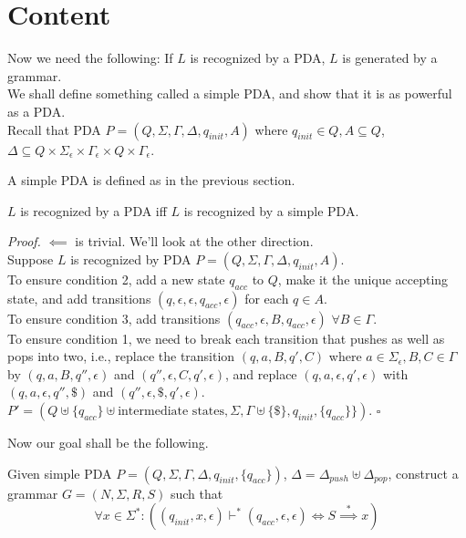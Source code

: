 \documentclass[a4paper]{article}
\newenvironment{proof}{\begin{breakbox}\textit{Proof.}}{\hfill$\square$\end{breakbox}}
\newcommand{\nl}{\vspace{0.2cm}\\}
\newcommand{\derives}{\stackrel{*}{\implies}}
\newcommand{\changesto}{\vdash}
\begin{document}
\section{Content}

Now we need the following: If $L$ is recognized by a PDA, $L$ is generated by a grammar.\nl
We shall define something called a simple PDA, and show that it is as powerful as a PDA.\nl

Recall that PDA $P = (Q, \Sigma, \Gamma, \Delta, q_{init}, A)$ where $q_{init} \in Q, A \subseteq Q$, $\Delta \subseteq Q \times \Sigma_\epsilon \times \Gamma_\epsilon \times Q \times \Gamma_\epsilon$.

A simple PDA is defined as in the previous section.

\begin{claim}
    $L$ is recognized by a PDA iff $L$ is recognized by a simple PDA.
\end{claim}
\begin{proof}
    $\impliedby$ is trivial. We'll look at the other direction.\nl
    Suppose $L$ is recognized by PDA $P = (Q, \Sigma, \Gamma, \Delta, q_{init}, A)$.\nl
    To ensure condition 2, add a new state $q_{acc}$ to $Q$, make it the unique accepting state, and add transitions $(q, \epsilon, \epsilon, q_{acc}, \epsilon)$ for each $q \in A$.\nl
    To ensure condition 3, add transitions $(q_{acc}, \epsilon, B, q_{acc}, \epsilon)$ $\forall B \in \Gamma$.\nl
    To ensure condition 1, we need to break each transition that pushes as well as pops into two, i.e., replace the transition $(q, a, B, q', C)$ where $a \in \Sigma_\epsilon, B, C \in \Gamma$ by $(q,
    a, B, q'', \epsilon)$ and $(q'', \epsilon, C, q', \epsilon)$, and replace $(q, a, \epsilon, q', \epsilon)$ with $(q, a, \epsilon, q'', \$)$ and $(q'', \epsilon, \$, q', \epsilon)$.\nl
$P' = (Q \uplus \{q_{acc}\} \uplus \text{intermediate states}, \Sigma, \Gamma \uplus \{\$\}, q_{init}, \{q_{acc}\}\})$.
\end{proof}

Now our goal shall be the following.\nl
\begin{ques}
    Given simple PDA $P = (Q, \Sigma, \Gamma, \Delta, q_{init}, \{q_{acc}\})$, $\Delta = \Delta_{push} \uplus \Delta_{pop}$, construct a grammar $G = (N, \Sigma, R, S)$ such that\nl
    $$\forall x \in \Sigma^*: ((q_{init}, x, \epsilon) \changesto^* (q_{acc}, \epsilon, \epsilon) \iff  S \derives x)$$
\end{ques}
\end{document}
